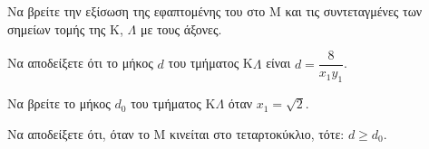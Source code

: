 \begin{alist}
    \item Να βρείτε την εξίσωση της εφαπτομένης του στο M και τις συντεταγμένες των σημείων τομής της K, $\Lambda$ με τους άξονες. 
    \item Να αποδείξετε ότι το μήκος $d$ του τμήματος K$\Lambda$ είναι $d = \dfrac{8}{x_1 y_1}$. 
    \item Να βρείτε το μήκος $d_0$ του τμήματος K$\Lambda$ όταν $x_1 = \sqrt{2}$. 
    \item Να αποδείξετε ότι, όταν το M κινείται στο τεταρτοκύκλιο, τότε: $d \geq d_0$. 
\end{alist}